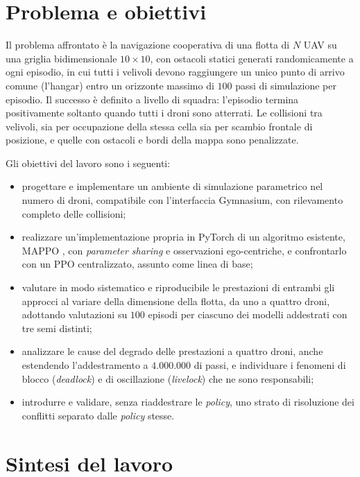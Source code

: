 \documentclass[12pt,a4paper,twoside]{report}
\newcommand{\parencite}[1]{\citep{#1}}
\begin{document}
\section{Problema e obiettivi}
\label{sec:problema_obiettivi}

Il problema affrontato è la navigazione cooperativa di una flotta di $N$ UAV su una griglia bidimensionale $10 \times 10$, con ostacoli statici generati randomicamente a ogni episodio, in cui tutti i velivoli devono raggiungere un unico punto di arrivo comune (l'hangar) entro un orizzonte massimo di $100$ passi di simulazione per episodio. Il successo è definito a livello di squadra: l'episodio termina positivamente soltanto quando tutti i droni sono atterrati. Le collisioni tra velivoli, sia per occupazione della stessa cella sia per scambio frontale di posizione, e quelle con ostacoli e bordi della mappa sono penalizzate.

Gli obiettivi del lavoro sono i seguenti:
\begin{itemize}
    \item progettare e implementare un ambiente di simulazione parametrico nel numero di droni, compatibile con l'interfaccia Gymnasium, con rilevamento completo delle collisioni;
    \item realizzare un'implementazione propria in PyTorch di un algoritmo esistente, MAPPO \parencite{yu2022}, con \emph{parameter sharing} e osservazioni ego-centriche, e confrontarlo con un PPO centralizzato, assunto come linea di base;
    \item valutare in modo sistematico e riproducibile le prestazioni di entrambi gli approcci al variare della dimensione della flotta, da uno a quattro droni, adottando valutazioni su $100$ episodi per ciascuno dei modelli addestrati con tre semi distinti;
    \item analizzare le cause del degrado delle prestazioni a quattro droni, anche estendendo l'addestramento a $4.000.000$ di passi, e individuare i fenomeni di blocco (\emph{deadlock}) e di oscillazione (\emph{livelock}) che ne sono responsabili;
    \item introdurre e validare, senza riaddestrare le \emph{policy}, uno strato di risoluzione dei conflitti separato dalle \emph{policy} stesse.
\end{itemize}
\newpage
\section{Sintesi del lavoro}
\label{sec:sintesi_lavoro}
\end{document}

